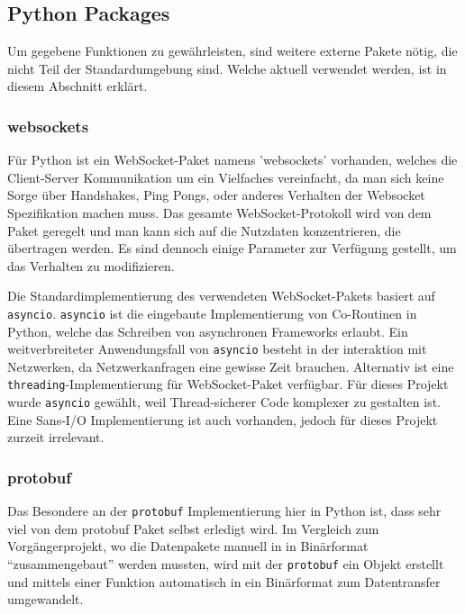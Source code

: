 \subsection{Python Packages}
Um gegebene Funktionen zu gewährleisten,
sind weitere externe Pakete nötig, 
die nicht Teil der Standardumgebung sind.
%
Welche aktuell verwendet werden,
ist in diesem Abschnitt erklärt.

\subsubsection{websockets}
Für Python ist ein WebSocket-Paket namens 'websockets' vorhanden, 
welches die Client-Server Kommunikation um ein Vielfaches vereinfacht, 
da man sich keine Sorge über Handshakes, Ping Pongs, 
oder anderes Verhalten der Websocket Spezifikation machen muss.
%
Das gesamte WebSocket-Protokoll wird von dem Paket geregelt 
und man kann sich auf die Nutzdaten konzentrieren, die übertragen werden.
%
Es sind dennoch einige Parameter zur Verfügung gestellt, 
um das Verhalten zu modifizieren.

Die Standardimplementierung des verwendeten WebSocket-Pakets basiert auf \texttt{asyncio}.
%
\texttt{asyncio} ist die eingebaute Implementierung von Co-Routinen in Python,
welche das Schreiben von asynchronen Frameworks erlaubt.
% 
Ein weitverbreiteter Anwendungsfall von \texttt{asyncio} besteht in der interaktion mit Netzwerken,
da Netzwerkanfragen eine gewisse Zeit brauchen.
Alternativ ist eine \texttt{threading}-Implementierung für WebSocket-Paket verfügbar. 
Für dieses Projekt wurde \texttt{asyncio} gewählt,
weil Thread-sicherer Code komplexer zu gestalten ist.
Eine Sans-I/O Implementierung ist auch vorhanden, 
jedoch für dieses Projekt zurzeit irrelevant.

\subsubsection{protobuf}
Das Besondere an der \texttt{protobuf} Implementierung hier in Python ist,
dass sehr viel von dem protobuf Paket selbst erledigt wird.
%
Im Vergleich zum Vorgängerprojekt,
wo die Datenpakete manuell in in Binärformat ``zusammengebaut'' werden mussten, 
wird mit der \texttt{protobuf} ein Objekt erstellt
und mittels einer Funktion automatisch in ein Binärformat zum Datentransfer umgewandelt.

